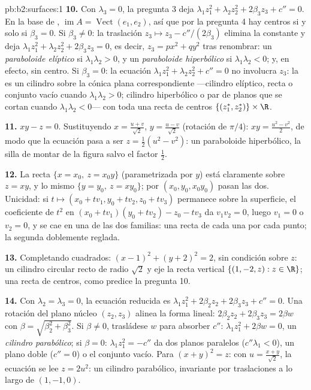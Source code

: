 \begin{solution}{pb:b2:surfaces:1}
\textbf{10.} Con $\lambda_3 = 0$, la pregunta 3 deja $\lambda_1z_1^2
+ \lambda_2z_2^2 + 2\beta_3z_3 + c'' = 0$. En la base de , $\operatorname{im}A = \operatorname{Vect}(e_1, e_2)$, así
que por la pregunta 4 hay centros si y solo si $\beta_3 = 0$. Si
$\beta_3 \neq 0$: la traslación $z_3 \mapsto z_3 - c''/(2\beta_3)$
elimina la constante y deja $\lambda_1z_1^2 + \lambda_2z_2^2 +
2\beta_3z_3 = 0$, es decir, $z_3 = px^2 + qy^2$ tras renombrar: un
\emph{paraboloide elíptico} si $\lambda_1\lambda_2 > 0$, y un
\emph{paraboloide hiperbólico} si $\lambda_1\lambda_2 < 0$; y, en
efecto, sin centro. Si $\beta_3 = 0$: la ecuación $\lambda_1z_1^2 +
\lambda_2z_2^2 + c'' = 0$ no involucra $z_3$: la  es un
cilindro sobre la cónica plana correspondiente ---cilindro elíptico,
recta o conjunto vacío cuando $\lambda_1\lambda_2 > 0$; cilindro
hiperbólico o par de planos que se cortan cuando $\lambda_1\lambda_2
< 0$--- con toda una recta de centros $\{(z_1^*, z_2^*)\} \times \R$.

\textbf{11.} $xy - z = 0$. Sustituyendo $x = \frac{u + v}{\sqrt2}$,
$y = \frac{u - v}{\sqrt2}$ (rotación de $\pi/4$): $xy = \frac{u^2 -
v^2}2$, de modo que la ecuación pasa a ser $z = \frac12(u^2 - v^2)$:
un paraboloide hiperbólico, la silla de montar de la figura salvo el
factor $\frac12$.

\textbf{12.} La recta $\{x = x_0,\ z = x_0y\}$ (parametrizada por
$y$) está claramente sobre $z = xy$, y lo mismo $\{y = y_0,\ z =
xy_0\}$; por $(x_0, y_0, x_0y_0)$ pasan las dos. Unicidad: si $t
\mapsto (x_0 + tv_1, y_0 + tv_2, z_0 + tv_3)$ permanece sobre la
superficie, el coeficiente de $t^2$ en $(x_0 + tv_1)(y_0 + tv_2) -
z_0 - tv_3$ da $v_1v_2 = 0$, luego $v_1 = 0$ o $v_2 = 0$, y se cae en
una de las dos familias: una recta de cada una por cada punto; la
segunda  doblemente reglada.

\textbf{13.} Completando cuadrados: $(x - 1)^2 + (y + 2)^2 = 2$, sin
condición sobre $z$: un cilindro circular recto de radio $\sqrt2$ y
eje la recta vertical $\{(1, -2, z) : z \in \R\}$; una recta de
centros, como predice la pregunta 10.

\textbf{14.} Con $\lambda_2 = \lambda_3 = 0$, la ecuación reducida es
$\lambda_1z_1^2 + 2\beta_2z_2 + 2\beta_3z_3 + c'' = 0$. Una rotación
del plano núcleo $(z_2, z_3)$ alinea la forma lineal: $2\beta_2z_2 +
2\beta_3z_3 = 2\beta w$ con $\beta = \sqrt{\beta_2^2 + \beta_3^2}$.
Si $\beta \neq 0$, trasládese $w$ para absorber $c''$:
$\lambda_1z_1^2 + 2\beta w = 0$, un \emph{cilindro parabólico}; si
$\beta = 0$: $\lambda_1z_1^2 = -c''$ da dos planos paralelos ($c''
\lambda_1 < 0$), un plano doble ($c'' = 0$) o el conjunto vacío. Para
$(x + y)^2 = z$: con $u = \frac{x + y}{\sqrt2}$, la ecuación se lee
$z = 2u^2$: un cilindro parabólico, invariante por traslaciones a lo
largo de $(1, -1, 0)$.


\end{solution}
